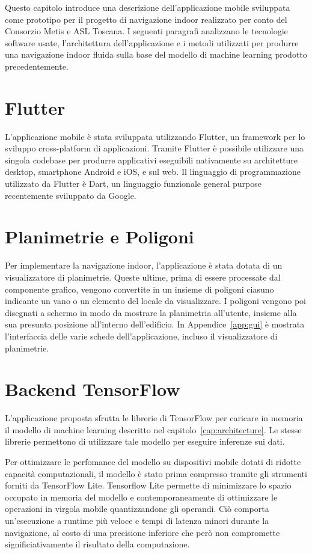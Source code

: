 
Questo capitolo introduce una descrizione dell'applicazione mobile sviluppata
come prototipo per il progetto di navigazione indoor realizzato per conto del
Consorzio Metis e ASL Toscana. I seguenti paragrafi analizzano le tecnologie
software usate, l'architettura dell'applicazione e i metodi utilizzati per
produrre una navigazione indoor fluida sulla base del modello di machine
learning prodotto precedentemente.
\section{Flutter}
L'applicazione mobile è stata sviluppata utilizzando 
Flutter\cite{flutter}, un framework per lo sviluppo cross-platform di
applicazioni. Tramite Flutter è possibile utilizzare una singola codebase per
produrre applicativi eseguibili nativamente su architetture desktop, smartphone
Android e iOS, e sul web. Il linguaggio di programmazione utilizzato da Flutter
è Dart, un linguaggio funzionale general purpose recentemente sviluppato da
Google.
\section{Planimetrie e Poligoni}
Per implementare la navigazione indoor, l'applicazione è stata dotata di un
visualizzatore di planimetrie. Queste ultime, prima di essere processate dal
componente grafico, vengono convertite in un insieme di poligoni ciasuno
indicante un vano o un elemento del locale da visualizzare. I poligoni vengono
poi disegnati a schermo in modo da mostrare la planimetria all'utente, insieme
alla sua presunta posizione all'interno dell'edificio. In
Appendice~\ref{app:gui} è mostrata l'interfaccia delle varie schede
dell'applicazione, incluso il visualizzatore di planimetrie.
\section{Backend TensorFlow}
L'applicazione proposta sfrutta le librerie di TensorFlow per caricare in
memoria il modello di machine learning descritto nel
capitolo~\ref{cap:architecture}. Le stesse librerie permettono di utilizzare
tale modello per eseguire inferenze sui dati. 

Per ottimizzare le perfomance del modello su dispositivi mobile dotati di
ridotte capacità computazionali, il modello è stato prima compresso tramite
gli strumenti forniti da TensorFlow Lite\cite{tensorflow-lite}. Tensorflow Lite
permette di minimizzare lo spazio occupato in memoria del modello e
contemporaneamente di ottimizzare le operazioni in virgola mobile
quantizzandone gli operandi. Ciò comporta un'esecuzione a runtime più veloce e
tempi di latenza minori durante la navigazione, al costo di una precisione
inferiore che però non compromette significiativamente il risultato della
computazione.
